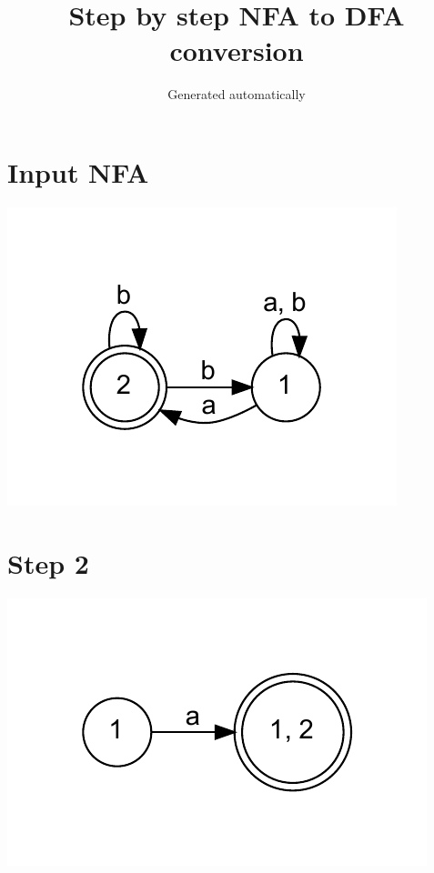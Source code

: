 \documentclass{article}
\title{\textbf{Step by step NFA to DFA conversion}}
\author{Generated automatically}
\begin{document}
\maketitle
\section{Input NFA}
\begin{center}
\includegraphics[width=\textwidth]{step0.dot.pdf}
\end{center}
\section{Step 2}
\begin{center}
\includegraphics[width=\textwidth]{step1.dot.pdf}
\end{center}
\end{document}
